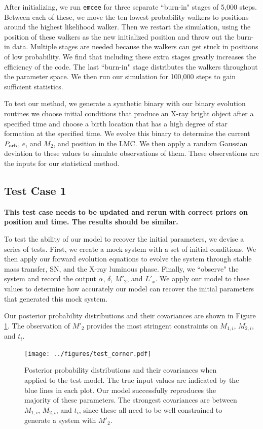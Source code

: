 \documentclass[12pt, preprint]{aastex}
\newcommand{\Porb}{\ifmmode {P_{\rm orb}}\else${P_{\rm orb}}$\fi}
\begin{document}
After initializing, we run {\tt emcee} for three separate ``burn-in" stages of 5,000 steps. Between each of these, we move the ten lowest probability walkers to positions around the highest likelihood walker. Then we restart the simulation, using the position of these walkers as the new initialized position and throw out the burn-in data. Multiple stages are needed because the walkers can get stuck in positions of low probability. We find that including these extra stages greatly increases the efficiency of the code. The last ``burn-in" stage distributes the walkers throughout the parameter space. We then run our simulation for 100,000 steps to gain sufficient statistics. 

To test our method, we generate a synthetic binary with our binary evolution routines we choose initial conditions that produce an X-ray bright object after a specified time and choose a birth location that has a high degree of star formation at the specified time. We evolve this binary to determine the current \Porb, $e$, and $M_2$, and position in the LMC. We then apply a random Gaussian deviation to these values to simulate observations of them. These observations are the inputs for our statistical method. 


\subsection{Test Case 1}

{\bf This test case needs to be updated and rerun with correct priors on position and time. The results should be similar.}

To test the ability of our model to recover the initial parameters, we devise a series of tests. First, we create a mock system with a set of initial conditions. We then apply our forward evolution equations to evolve the system through stable mass transfer, SN, and the X-ray luminous phase. Finally, we ``observe" the system and record the output $\alpha$, $\delta$, $M'_2$, and $L'_x$. We apply our model to these values to determine how accurately our model can recover the initial parameters that generated this mock system. 

Our posterior probability distributions and their covariances are shown in Figure \ref{fig:test_corner}. The observation of $M'_2$ provides the most stringent constraints on $M_{1,i}$, $M_{2,i}$, and $t_i$.

\begin{figure}[h!]
\begin{center}
\texttt{[image: ../figures/test\_corner.pdf]}
\caption{Posterior probability distributions and their covariances when applied to the test model. The true input values are indicated by the blue lines in each plot. Our model successfully reproduces the majority of these parameters. The strongest covariances are between $M_{1,i}$, $M_{2,i}$, and $t_i$, since these all need to be well constrained to generate a system with $M'_2$. }
\label{fig:test_corner}
\end{center}
\end{figure}
\end{document}
